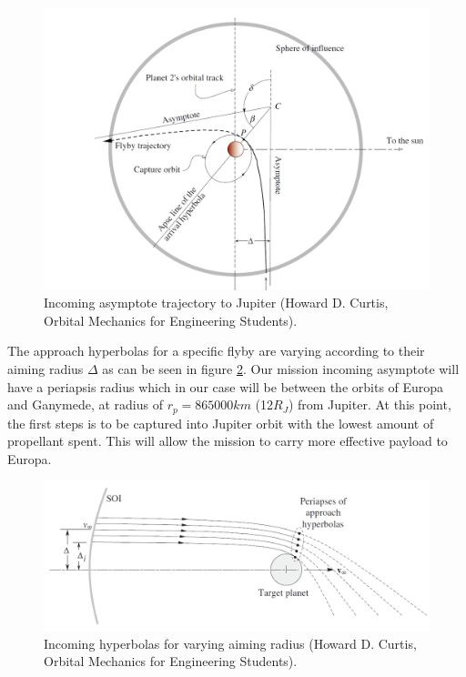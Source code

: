 \begin{figure}[htb]
\centering
\includegraphics[scale=0.3]{figures/Orbiter/capture.png}
\caption{Incoming asymptote trajectory to Jupiter (Howard D. Curtis, Orbital Mechanics for Engineering Students).\cite{orbitals}}
\label{fig:capture}
\end{figure}

The approach hyperbolas for a specific flyby are varying according to their aiming radius $\Delta$ as can be seen in figure \ref{fig:joihyp}. Our mission incoming asymptote will have a periapsis radius which in our case will be between the orbits of Europa and Ganymede, at radius of $r_p=865000km$ (12$R_J$) from Jupiter. At this point, the first steps is to be captured into Jupiter orbit with the lowest amount of propellant spent. This will allow the mission to carry more effective payload to Europa. 

\begin{figure}[htb]
\centering
\includegraphics[scale=0.3]{figures/Orbiter/joihyp.png}
\caption{Incoming hyperbolas for varying aiming radius (Howard D. Curtis, Orbital Mechanics for Engineering Students).\cite{orbitals}}
\label{fig:joihyp}
\end{figure}

